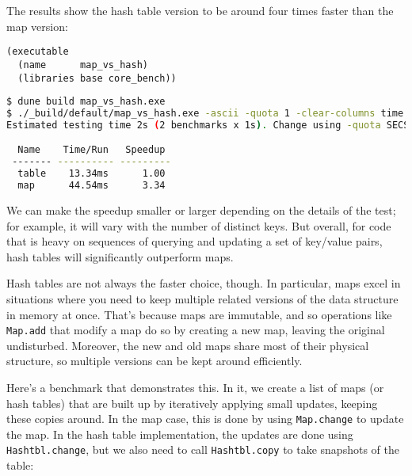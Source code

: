 The results show the hash table version to be around four times faster
than the map version:

\begin{lstlisting}
(executable
  (name      map_vs_hash)
  (libraries base core_bench))
\end{lstlisting}

\begin{lstlisting}[language=bash]
$ dune build map_vs_hash.exe
$ ./_build/default/map_vs_hash.exe -ascii -quota 1 -clear-columns time speedup
Estimated testing time 2s (2 benchmarks x 1s). Change using -quota SECS.

  Name    Time/Run   Speedup
 ------- ---------- ---------
  table    13.34ms      1.00
  map      44.54ms      3.34
\end{lstlisting}

We can make the speedup smaller or larger depending on the details of
the test; for example, it will vary with the number of distinct keys.
But overall, for code that is heavy on sequences of querying and
updating a set of key/value pairs, hash tables will significantly
outperform maps.

Hash tables are not always the faster choice, though. In particular,
maps excel in situations where you need to keep multiple related
versions of the data structure in memory at once. That's because maps
are immutable, and so operations like \passthrough{\lstinline!Map.add!}
that modify a map do so by creating a new map, leaving the original
undisturbed. Moreover, the new and old maps share most of their physical
structure, so multiple versions can be kept around efficiently.

Here's a benchmark that demonstrates this. In it, we create a list of
maps (or hash tables) that are built up by iteratively applying small
updates, keeping these copies around. In the map case, this is done by
using \passthrough{\lstinline!Map.change!} to update the map. In the
hash table implementation, the updates are done using
\passthrough{\lstinline!Hashtbl.change!}, but we also need to call
\passthrough{\lstinline!Hashtbl.copy!} to take snapshots of the table:

